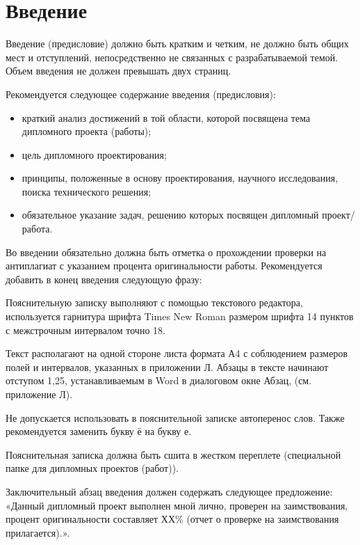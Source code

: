 
\section*{Введение}




Введение (предисловие) должно быть кратким и четким, не должно быть общих мест и отступлений, непосредственно не связанных с разрабатываемой темой. Объем введения не должен превышать двух страниц.

Рекомендуется следующее содержание введения (предисловия):
\begin{itemize}
	\item краткий анализ достижений в той области, которой посвящена тема дипломного проекта (работы);
	\item цель дипломного проектирования;
	\item принципы, положенные в основу проектирования, научного исследования, поиска технического решения;
	\item обязательное указание задач, решению которых посвящен дипломный проект/работа.
\end{itemize}

Во введении обязательно должна быть отметка о прохождении проверки на антиплагиат с указанием процента оригинальности работы. Рекомендуется добавить в конец введения следующую фразу:

Пояснительную записку выполняют с помощью текстового редактора, используется гарнитура шрифта Times New Roman размером шрифта 14 пунктов с межстрочным интервалом точно 18.

Текст располагают на одной стороне листа формата А4 с соблюдением размеров полей и интервалов, указанных в приложении Л. Абзацы в тексте начинают отступом 1,25, устанавливаемым в Word в диалоговом окне Абзац, (см. приложение Л).

Не допускается использовать в пояснительной записке автоперенос слов. Также рекомендуется заменить букву ё на букву е.

Пояснительная записка должна быть сшита в жестком переплете (специальной папке для дипломных проектов (работ)).

Заключительный абзац введения должен содержать следующее
предложение: «Данный дипломный проект выполнен мной лично, проверен на
заимствования, процент оригинальности составляет ХХ\% (отчет о проверке на
заимствования прилагается).».

\newpage

